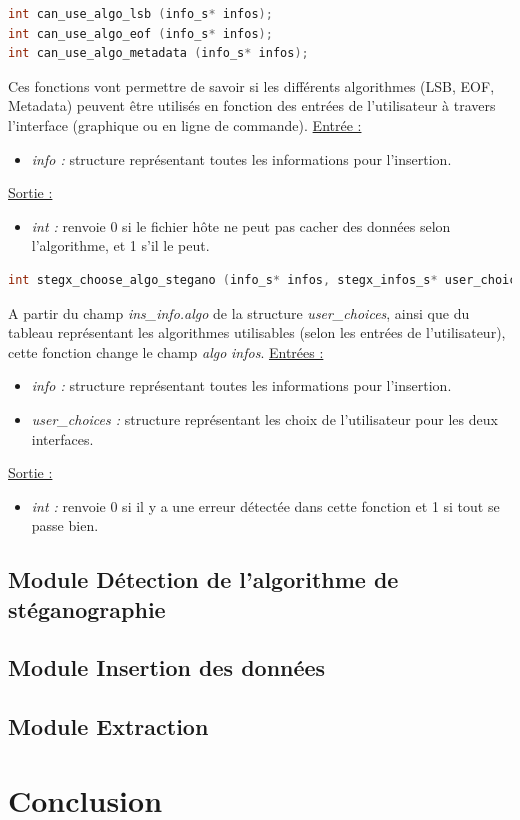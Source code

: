 \documentclass[11pt]{article}
\begin{document}
\begin{lstlisting}[language=c]
int can_use_algo_lsb (info_s* infos);
int can_use_algo_eof (info_s* infos);
int can_use_algo_metadata (info_s* infos);
\end{lstlisting}

Ces fonctions vont permettre de savoir si les différents algorithmes 
(LSB, EOF, Metadata) peuvent être utilisés en fonction des entrées 
de l'utilisateur à travers l'interface (graphique ou en ligne de commande). 
\newline
\underline{Entrée :} 
\begin{itemize}
\item \textit{info :} structure représentant toutes les informations pour 
l'insertion.  
\end{itemize}
\underline{Sortie :} 
\begin{itemize}
\item \textit{int :} renvoie 0 si le fichier hôte ne peut pas cacher des 
données selon l'algorithme, et 1 s'il le peut. 
\newline 
\end{itemize}

\begin{lstlisting}[language=c]
int stegx_choose_algo_stegano (info_s* infos, stegx_infos_s* user_choices); 
\end{lstlisting}

A partir du champ \textit{ins\_info.algo} de la structure \textit{user\_choices}, 
ainsi que du tableau représentant les algorithmes utilisables (selon les 
entrées de l'utilisateur), cette fonction change le champ \textit{algo} 
\textit{infos}. 
\newline
\underline{Entrées :} 
\begin{itemize}
\item \textit{info :} structure représentant toutes les informations pour 
l'insertion.  
\item \textit{user\_choices :} structure représentant les choix de 
l'utilisateur pour les deux interfaces. 
\end{itemize}
\underline{Sortie :} 
\begin{itemize}
\item \textit{int :} renvoie 0 si il y a une erreur détectée dans cette 
fonction et 1 si tout se passe bien.  
\newline 
\end{itemize}

\subsection{Module Détection de l'algorithme de
stéganographie}
\subsection{Module Insertion des données}
\subsection{Module Extraction}

\section{Conclusion}
\end{document}

